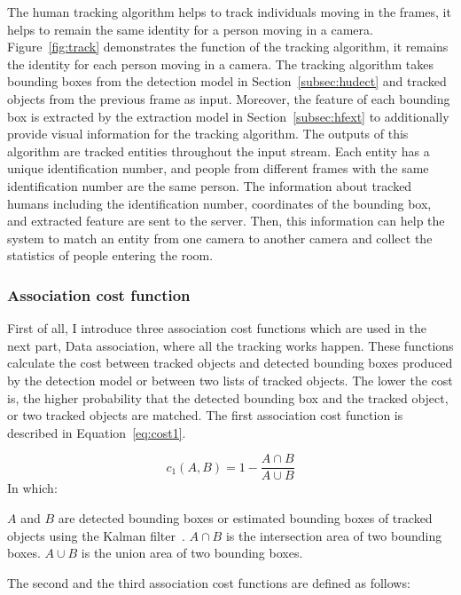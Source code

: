 \documentclass[../main.tex]{subfiles}
\begin{document}
The human tracking algorithm helps to track individuals moving in the frames, it helps to remain the same identity for a person moving in a camera. Figure~\ref{fig:track} demonstrates the function of the tracking algorithm, it remains the identity for each person moving in a camera. The tracking algorithm takes bounding boxes from the detection model in Section~\ref{subsec:hudect} and tracked objects from the previous frame as input. Moreover, the feature of each bounding box is extracted by the extraction model in Section~\ref{subsec:hfext} to additionally provide visual information for the tracking algorithm. The outputs of this algorithm are tracked entities throughout the input stream. Each entity has a unique identification number, and people from different frames with the same identification number are the same person. The information about tracked humans including the identification number, coordinates of the bounding box, and extracted feature are sent to the server. Then, this information can help the system to match an entity from one camera to another camera and collect the statistics of people entering the room.

\subsubsection{Association cost function}
First of all, I introduce three association cost functions which are used in the next part, Data association, where all the tracking works happen. These functions calculate the cost between tracked objects and detected bounding boxes produced by the detection model or between two lists of tracked objects. The lower the cost is, the higher probability that the detected bounding box and the tracked object, or two tracked objects are matched. The first association cost function is described in Equation~\ref{eq:cost1}.

\begin{equation}\label{eq:cost1}
    c_{1}(A, B) = 1 - \dfrac {A \cap B} {A \cup B}
\end{equation}
In which:
\begin{outline}
 \1 $A$ and $B$ are detected bounding boxes or estimated bounding boxes of tracked objects using the Kalman filter~\cite{kalman}.
 \1 $A \cap B$ is the intersection area of two bounding boxes.
 \1 $A \cup B$ is the union area of two bounding boxes.
\end{outline}

The second and the third association cost functions are defined as follows:
\end{document}

